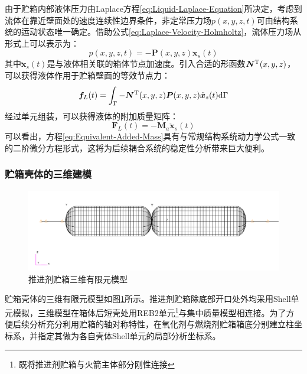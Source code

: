 由于贮箱内部液体压力由Laplace方程\eqref{eq:Liquid-Laplace-Equation}所决定，考虑到流体在靠近壁面处的速度连续性边界条件，非定常压力场$p(x,y,z,t)$可由结构系统的运动状态唯一确定。借助公式\eqref{eq:Laplace-Velocity-Holmholtz}，流体压力场从形式上可以表示为：
\begin{equation}
	p(x,y,z,t)=-{\boldsymbol{P}}(x,y,z)\ddot{\boldsymbol{x}}_s(t)
\end{equation}
其中$\ddot{\boldsymbol{x}}_s(t)$是与液体相关联的箱体节点加速度。引入合适的形函数$\boldsymbol{N}^{\mathrm{T}}(x,y,z)$，可以获得液体作用于贮箱壁面的等效节点力：
\begin{equation}
	\boldsymbol{f}_L(t)=\int_\Gamma -\boldsymbol{N}^{\mathrm{T}}(x,y,z) \boldsymbol{P}(x,y,z)\ddot{\boldsymbol{x}}_s(t)\mathrm{d} \Gamma
\end{equation}
经过单元组装，可以获得液体的附加质量矩阵：
\begin{equation}
	\label{eq:Equivalent-Added-Mass}
	\boldsymbol{F}_L(t)=-\boldsymbol{M}_a \ddot{\boldsymbol{x}}_s(t)
\end{equation}
可以看出，方程\eqref{eq:Equivalent-Added-Mass}具有与常规结构系统动力学公式一致的二阶微分方程形式，这将为后续耦合系统的稳定性分析带来巨大便利。

\subsubsection{贮箱壳体的三维建模}
\label{sec:3D-Model-Hulk}
\begin{figure}[!htb]
  \centering
  \includegraphics[width=\linewidth]{Liquid-Tank-FEM-MSC.pdf}
  \caption{推进剂贮箱三维有限元模型}\label{Liquid-Tank-FEM-MSC}
\end{figure}

贮箱壳体的三维有限元模型如图\ref{Liquid-Tank-FEM-MSC}所示。推进剂贮箱除底部开口处外均采用Shell单元模拟，三维模型在箱体后短壳处用REB2单元\footnote{既将推进剂贮箱与火箭主体部分刚性连接}与集中质量模型相连接。为了方便后续分析充分利用贮箱的轴对称特性，在氧化剂与燃烧剂贮箱箱底分别建立柱坐标系，并指定其做为各自壳体Shell单元的局部分析坐标系。

